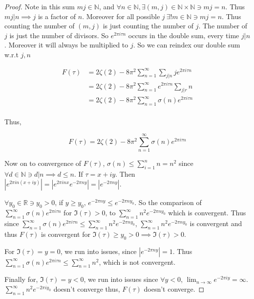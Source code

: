 \documentclass{article}
\newcommand{\R}{\mathbb{R}}
\newcommand{\N}{\mathbb{N}}
\newcommand{\abs}[1]{\left\lvert #1\right\rvert}
\begin{document}
\begin{proof}
    Note in this sum $mj \in \N$, and $\forall n \in \N, \exists (m, j) \in \N \times \N \ni mj = n$. Thus $mj | n \implies j$ is a factor of $n$. Moreover for all possible $j ~ \exists! m \in \N \ni mj = n$. Thus counting the number of $(m, j)$ is just counting the number of $j$. The number of $j$ is just the number of divisors. So $e^{2 \pi i \tau n}$ occurs in the double sum, every time $j | n$. Moreover it will always be multiplied to $j$. So we can reindex our double sum w.r.t $j, n$
    
    \begin{align*}
        F(\tau) &= 2\zeta(2) - 8 \pi^2\sum_{n = 1}^{\infty} \sum_{j | n} j e^{2 \pi i \tau n} \\
        &= 2\zeta(2) - 8 \pi^2\sum_{n = 1}^{\infty} e^{2 \pi i \tau n}  \sum_{j | r} n  \\
        &= 2\zeta(2) - 8 \pi^2\sum_{n = 1}^{\infty} \sigma(n) e^{2 \pi i \tau n}  \\
    \end{align*}

    Thus, 
    
    \begin{equation*}
        F(\tau) = 2\zeta(2) - 8 \pi^2\sum_{n = 1}^{\infty} \sigma(n) e^{2 \pi i \tau n}
    \end{equation*}

    Now on to convergence of $F(\tau)$, $\sigma(n) \leq \sum_{i = 1}^{n} n = n^2$ since $\forall d \in \N \ni d|n \implies d \leq n$. If $\tau = x + iy$. Then $\abs{e^{2 \pi i n(x + iy)}} = \abs{e^{2 \pi i n x} e^{-2 \pi n y}} = \abs{e^{-2 \pi n y}}$. 
    
    $\forall y_0 \in \R \ni y_0 > 0$, if $y \geq y_0$, $e^{-2 \pi n y} \leq e^{-2 \pi n y_0}$. So the comparison of $\sum_{n = 1}^{\infty} \sigma(n) e^{2 \pi i \tau n}$ for $\Im(\tau) > 0$, to $\sum_{n = 1}^{\infty} n^2 e^{-2 \pi n y_0}$ which is convergent. Thus since $\sum_{n = 1}^{\infty} \sigma(n) e^{2 \pi i \tau n} \leq \sum_{n = 1}^{\infty} n^2 e^{-2 \pi n y_0}$, $\sum_{n = 1}^{\infty} n^2 e^{-2 \pi n y_0}$ is convergent and thus $F(\tau)$ is convergent for $\Im(\tau) \geq y_0 > 0 \implies \Im(\tau) > 0$.


    For $\Im(\tau) = y = 0$, we run into issues, since $ \abs{e^{-2 \pi n y}} = 1$. Thus $\sum_{n = 1}^{\infty} \sigma(n) e^{2 \pi i \tau n} \leq \sum_{n = 1}^{\infty} n^2$, which is not convergent. 
    
    Finally for, $\Im(\tau) = y < 0$, we run into issues since $\forall y < 0$, $\lim_{n \to \infty}e^{-2 \pi i y}  = \infty$. $\sum_{n = 1}^{\infty} n^2 e^{-2 \pi i y_0}$ doesn't converge thus, $F(\tau)$ doesn't converge.
\end{proof}
\end{document}
